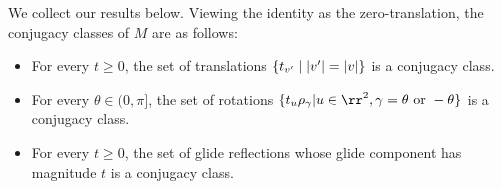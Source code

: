 \documentclass{scrartcl}
\begin{document}
\begin{solution}
        We collect our results below. Viewing the identity as the zero-translation, the conjugacy classes of $M$ are as follows:
        \begin{itemize}
            \item {} For every $t\ge 0$, the set of translations $\{t_{v'}\mid \lvert v'\rvert=\lvert v\rvert\}$ is a conjugacy class.
            \item {} For every $\theta\in (0,\pi]$, the set of rotations $\{t_u\rho_\gamma| u\in \rr^2, \gamma=\theta \text{ or } -\theta\}$ is a conjugacy class.
            \item {} For every $t\ge 0$, the set of glide reflections whose glide component has magnitude $t$ is a conjugacy class.
        \end{itemize}
        \end{solution}

\newpset

\end{document}

